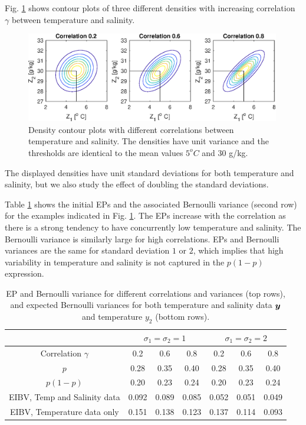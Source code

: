 \documentclass[aoas]{imsart}
\begin{document}
Fig. \ref{illus_bivarDens} shows contour plots of three different
densities with increasing correlation $\gamma$ between temperature and
salinity. 
\begin{figure}[h!] \centering
  \includegraphics[width=0.99\textwidth]{Figures/illus_bivar.eps}
  \caption{Density contour plots with different correlations between
    temperature and salinity. The densities have unit variance and the
    thresholds are identical to the mean values $5^o C$ and
    $30$ g/kg.}
\label{illus_bivarDens}
\end{figure}
The displayed densities have unit standard deviations for both
temperature and salinity, but we also study the effect of doubling the
standard deviations.

Table \ref{tab:sim_rhoab} shows the initial EPs and the associated
Bernoulli variance (second row) for the examples indicated in Fig.
\ref{illus_bivarDens}. The EPs increase with the correlation as there
is a strong tendency to have concurrently low temperature and salinity. The Bernoulli variance is similarly large for high
correlations. EPs and Bernoulli variances are the same for standard
deviation $1$ or $2$, which implies that high variability in
temperature and salinity is not captured in the $p(1-p)$ expression.

\begin{table}[!h] \centering \caption{EP and Bernoulli variance for
    different correlations and variances (top rows), and expected
    Bernoulli variances for both temperature and salinity data ${\boldsymbol y}$ and 
    temperature $y_2$ (bottom rows).}
  \begin{tabular}{c|ccc|ccc}
 &\multicolumn{3}{c}{$\sigma_1=\sigma_2=1$} & \multicolumn{3}{c}{$\sigma_1=\sigma_2=2$} \\
\hline
Correlation $\gamma$ & 0.2 & 0.6 & 0.8 & 0.2 & 0.6 & 0.8 \\
\hline
$p$ & 0.28 & 0.35 & 0.40 & 0.28 & 0.35 & 0.40 \\ 
$p(1-p)$ & 0.20 & 0.23 & 0.24 & 0.20 & 0.23 & 0.24 \\ 
EIBV, Temp and Salinity data & 0.092 & 0.089 & 0.085 & 0.052 & 0.051 & 0.049 \\ 
EIBV, Temperature data only & 0.151 & 0.138 & 0.123 & 0.137 & 0.114 & 0.093 \\ 
\hline
\end{tabular}
\label{tab:sim_rhoab}
\end{table}
\end{document}
